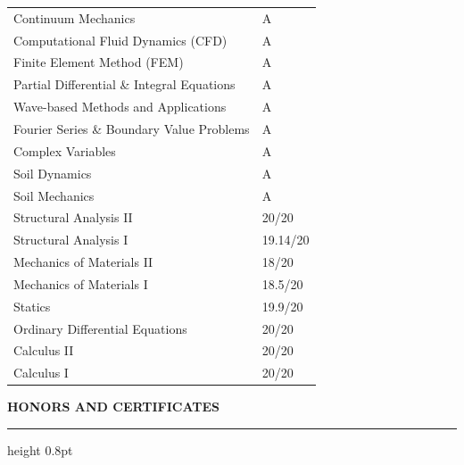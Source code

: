 \documentclass[10pt, letterpaper]{article}
\newcommand{\rsection}[1]{%
  \vspace{10pt}%
  {\large\bfseries\MakeUppercase{#1}}%
  \vspace{1pt}%
  \hrule height 0.8pt%
  \vspace{5pt}%
}
\begin{document}
\vspace{2pt}
\begin{tabular}{@{}p{8cm}l@{}}
  Continuum Mechanics & A \\[1pt]
  Computational Fluid Dynamics (CFD) & A \\[1pt]
  Finite Element Method (FEM) & A \\[1pt]
  Partial Differential \& Integral Equations & A \\[1pt]
  Wave-based Methods and Applications & A \\[1pt]
  Fourier Series \& Boundary Value Problems & A \\[1pt]
  Complex Variables & A \\[1pt]
  Soil Dynamics & A \\[1pt]
  Soil Mechanics & A \\[1pt]
  Structural Analysis II & 20/20 \\
  Structural Analysis I & 19.14/20 \\[1pt]
  Mechanics of Materials II & 18/20 \\[1pt]
  Mechanics of Materials I & 18.5/20 \\[1pt]
  Statics & 19.9/20 \\[1pt]
  Ordinary Differential Equations & 20/20 \\[1pt]
  Calculus II & 20/20 \\[1pt]
  Calculus I & 20/20 \\[1pt]
\end{tabular}

\rsection{Honors and Certificates}
\end{document}
